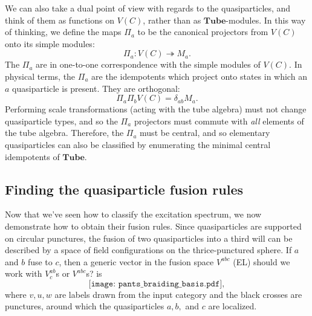 \documentclass[12pt,a4paper]{article}
\newcounter{arrow}
\newcommand\be            {\begin{equation}}
\newcommand\ee            {\end{equation}}
\newcommand{\fube}{\textbf{Tube}}
\newcommand{\tube}{\textbf{Tube}}
\newcommand{\fld}{\mathcal{F}} %
\newcommand{\ethan}[1]{{\color{amethyst}\footnotesize{(EL) #1}}}
\begin{document}


We can also take a dual point of view with regards to the quasiparticles, and think of them as functions on $V(C)$, rather than as $\tube$-modules. In this way of thinking, we define the maps $\Pi_a$ to be the canonical projectors from $V(C)$ onto its simple modules:
\be \Pi_a : V(C) \twoheadrightarrow M_a.\ee
The $\Pi_a$ are in one-to-one correspondence with the simple modules of $V(C)$. In physical terms, the $\Pi_a$ are the idempotents which project onto states in which an $a$ quasiparticle is present. They are orthogonal:
\be \Pi_a \Pi_b V(C) = \delta_{ab}M_a.\ee
Performing scale transformations (acting with the tube algebra) must not change quasiparticle types, and so the $\Pi_a$ projectors must commute with {\it all} elements of the tube algebra. Therefore, the $\Pi_a$ must be central, and so elementary quasiparticles can also be classified by enumerating the minimal central idempotents of $\tube$. 


\subsection{Finding the quasiparticle fusion rules}

Now that we've seen how to classify the excitation spectrum, we now demonstrate how to obtain their fusion rules. Since quasiparticles are supported on circular punctures, the fusion of two quasiparticles into a third will can be described by a space of field configurations on the thrice-punctured sphere. If $a$ and $b$ fuse to $c$, then a generic vector in the fusion space $V^{abc}$ \ethan{should we work with $V^{ab}_c$s or $V^{abc}$s?} is 
\be \label{pants_braiding_basis} \texttt{[image: pants\_braiding\_basis.pdf]},\ee
where $v,u,w$ are labels drawn from the input category and the black crosses are punctures, around which the quasiparticles $a,b,$ and $c$ are localized. 
\end{document}

